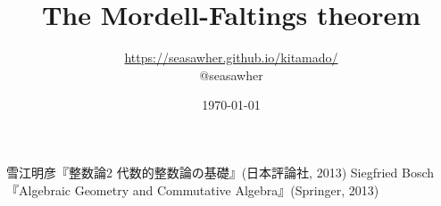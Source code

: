 \documentclass[10pt]{jsarticle}
\begin{document}
\title{The Mordell-Faltings theorem}
\author{\url{https://seasawher.github.io/kitamado/} \\ @seasawher}
\date{\today}
\maketitle



\newpage



\begin{thebibliography}{1}
 雪江明彦『整数論2 代数的整数論の基礎』(日本評論社, 2013)
 Siegfried Bosch『Algebraic Geometry and Commutative Algebra』(Springer, 2013)
\end{thebibliography}
\end{document}
